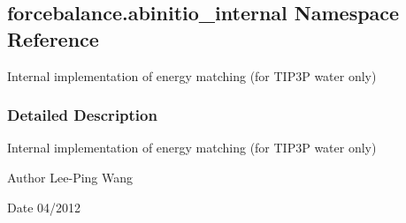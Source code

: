 \hypertarget{namespaceforcebalance_1_1abinitio__internal}{}\subsection{forcebalance.\+abinitio\+\_\+internal Namespace Reference}
\label{namespaceforcebalance_1_1abinitio__internal}


Internal implementation of energy matching (for T\+I\+P3P water only)  




\subsubsection{Detailed Description}
Internal implementation of energy matching (for T\+I\+P3P water only) 

\begin{DoxyAuthor}{Author}
Lee-\/\+Ping Wang 
\end{DoxyAuthor}
\begin{DoxyDate}{Date}
04/2012 
\end{DoxyDate}
